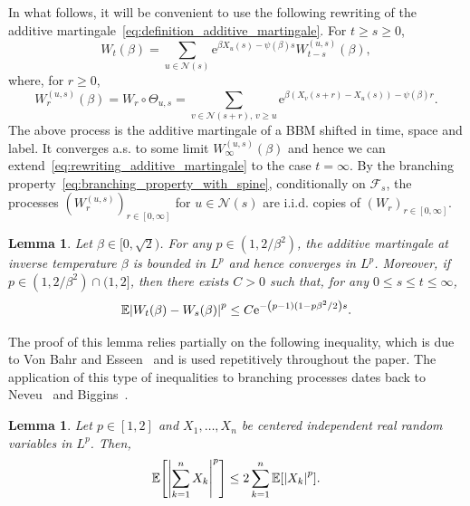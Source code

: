 \documentclass[10pt]{amsart}
\newtheorem{lemm}[theo]{Lemma}\newtheorem{prop}[theo]{Proposition}\newtheorem{coro}[theo]{Corollary}\newtheorem{conj}[theo]{Conjecture}
\theoremstyle{definition}\newtheorem{defi}[theo]{Definition}\newtheorem{rema}[theo]{Remark}\newtheorem{exam}[theo]{Example}\newtheorem{exem}[theo]{Example}\newtheorem{nota}[theo]{Notation}
\newcommand{\e}{\mathrm{e}}
\newcommand{\E}{\mathbb{E}}
\newcommand\1{\mathds{1}}
\newcommand{\cF}{\mathcal{F}}
\newcommand{\cN}{\mathcal{N}}
\newcommand{\Expec}[1]{\mathbb{E}\left[#1\right]}
\newcommand{\abs}[1]{\left\lvert#1\right\rvert}
\let\originalleft\left
\let\originalright\right
\renewcommand{\left}{\mathopen{}\mathclose\bgroup\originalleft}
\renewcommand{\right}{\aftergroup\egroup\originalright}
\begin{document}
In what follows, it will be convenient to use the following rewriting of the additive martingale~\eqref{eq:definition_additive_martingale}. For $t \geq s \geq 0$,
\begin{equation}\label{eq:rewriting_additive_martingale}
W_t(\beta) = \sum_{u \in \cN(s)} \e^{\beta X_u(s) - \psi(\beta)s} W_{t - s}^{(u, s)}(\beta),
\end{equation}
where, for $r \geq 0$,
\begin{equation*}
W_r^{(u, s)}(\beta) = W_r \circ \Theta_{u, s} = \sum_{v \in \cN(s + r),\, v \geq u} \e^{\beta (X_v(s + r) - X_u(s)) - \psi(\beta)r}.
\end{equation*}
The above process is the additive martingale of a BBM shifted in time, space and label. It converges a.s. to some limit $W_\infty^{(u, s)}(\beta)$ and hence we can extend~\eqref{eq:rewriting_additive_martingale} to the case $t = \infty$. By the branching property~\eqref{eq:branching_property_with_spine}, conditionally on $\cF_s$, the processes $(W_r^{(u, s)})_{r \in[0, \infty]}$ for $u \in \cN(s)$ are i.i.d. copies of $(W_r)_{r \in [0, \infty]}$.

\begin{lemm}\label{lem:additive_martingale_convergence_in_Lp}
Let $\beta \in [0, \sqrt{2})$. For any $p \in (1, 2/\beta^2)$, the additive martingale at inverse temperature $\beta$ is bounded in $L^p$ and hence converges in $L^p$. Moreover, if $p \in (1, 2/\beta^2) \cap (1, 2]$, then there exists $C>0$ such that, for any $0 \leq s \leq t \leq \infty$,
\begin{equation*}
\E \left| W_t(\beta) - W_s(\beta) \right|^p \leq C \e^{-\left(p - 1)(1 - p\beta^2/2\right)s}.
\end{equation*}
\end{lemm}

The proof of this lemma relies partially on the following inequality, which is due to Von Bahr and Esseen~\cite[Theorem~2]{VonBahrEsseen1965} and is used repetitively throughout the paper. The application of this type of inequalities to branching processes dates back to Neveu~\cite{Neveu1988} and Biggins~\cite{Biggins1992}.

\begin{lemm}\label{lem:von_Bahr}
Let $p \in [1,2]$ and $X_1,\dots,X_n$ be centered independent real random variables in $L^p$. Then,
\[
\Expec{\abs{\sum_{k=1}^n X_k}^p}
\leq 2 \sum_{k=1}^n \Expec{\abs{X_k}^p}.
\]
\end{lemm}
\end{document}
